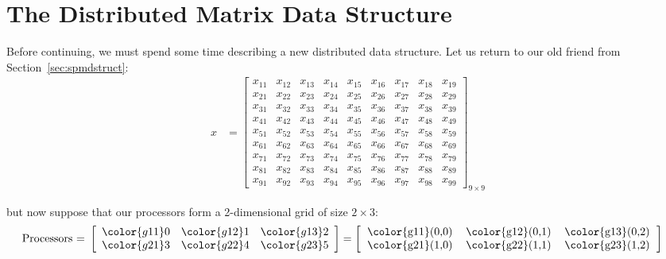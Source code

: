 

\chapter{The Distributed Matrix Data Structure}

Before continuing, we must spend some time describing a new distributed data structure.  Let us return to our old friend from Section~\ref{sec:spmdstruct}:\\
\begin{align*}
x &= \left[
      \begin{array}{lllllllll}
      x_{11} & x_{12} & x_{13} & x_{14} & x_{15} & x_{16} & x_{17} & x	_{18} & x_{19}\\
      x_{21} & x_{22} & x_{23} & x_{24} & x_{25} & x_{26} & x_{27} & x	_{28} & x_{29}\\
      x_{31} & x_{32} & x_{33} & x_{34} & x_{35} & x_{36} & x_{37} & x	_{38} & x_{39}\\
      x_{41} & x_{42} & x_{43} & x_{44} & x_{45} & x_{46} & x_{47} & x	_{48} & x_{49}\\
      x_{51} & x_{52} & x_{53} & x_{54} & x_{55} & x_{56} & x_{57} & x	_{58} & x_{59}\\
      x_{61} & x_{62} & x_{63} & x_{64} & x_{65} & x_{66} & x_{67} & x	_{68} & x_{69}\\
      x_{71} & x_{72} & x_{73} & x_{74} & x_{75} & x_{76} & x_{77} & x	_{78} & x_{79}\\
      x_{81} & x_{82} & x_{83} & x_{84} & x_{85} & x_{86} & x_{87} & x	_{88} & x_{89}\\
      x_{91} & x_{92} & x_{93} & x_{94} & x_{95} & x_{96} & x_{97} & x	_{98} & x_{99}
      \end{array}
\right]_{9\times 9}
\end{align*}

but now suppose that our processors form a 2-dimensional grid of size $2\times3$:
\begin{align*}
\text{Processors = }
\left[
      \begin{array}{lll}
      \color{g11}0 & \color{g12}1 & \color{g13}2\\
      \color{g21}3 & \color{g22}4 & \color{g23}5
      \end{array}
\right] &= 
\left[
      \begin{tabular}{lll}
      \color{g11}(0,0) & \color{g12}(0,1) & \color{g13}(0,2)\\
      \color{g21}(1,0) & \color{g22}(1,1) & \color{g23}(1,2)
      \end{tabular}
\right]
\end{align*}

